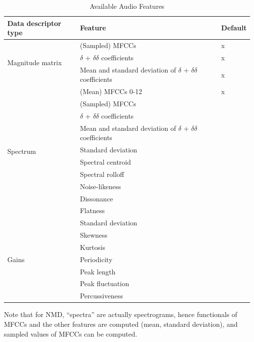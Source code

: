 \begin{table}
\begin{tabular}{p{}|p{}|p{}}
{\bf Data descriptor type} & {\bf Feature} & {\bf Default}\\
\hline
\multirow{3}{*}{Magnitude matrix} & (Sampled) MFCCs & x \\
 & $\delta$ + $\delta\delta$ coefficients & x \\
 &  Mean and standard deviation of $\delta$ + $\delta\delta$ coefficients & x \\
\hline
\multirow{10}{*}{Spectrum} & (Mean) MFCCs 0-12 & x \\
 & (Sampled) MFCCs & \\
 & $\delta$ + $\delta\delta$ coefficients & \\
 & Mean and standard deviation of $\delta$ + $\delta\delta$ coefficients & \\
 & Standard deviation & \\
 & Spectral centroid & \\
 & Spectral rolloff & \\
 & Noise-likeness & \\
 & Dissonance & \\
 & Flatness & \\
\hline
\multirow{7}{*}{Gains} & Standard deviation & \\
 & Skewness & \\
 & Kurtosis & \\
 & Periodicity & \\
 & Peak length & \\
 & Peak fluctuation & \\
 & Percussiveness \\
\end{tabular}
\caption{Available Audio Features}
\label{tab:AvailFeatures}
\end{table}

Note that for NMD, ``spectra'' are actually spectrograms, hence functionals of
MFCCs and the other features are computed (mean, standard deviation), and
sampled values of MFCCs can be computed.

